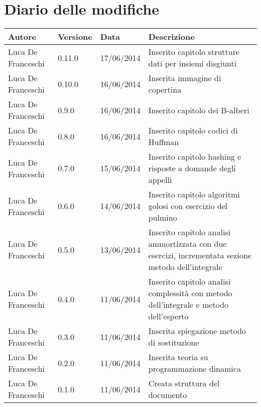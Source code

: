 \section*{Diario delle modifiche}

\begin{center}

	\begin{table}[htpd]
		\begin{tabular}{| l | l | l | p{50mm} |}
			\hline
			\hline
			\textbf{Autore} & \textbf{Versione} & \textbf{Data} & \textbf{Descrizione} \\
			\hline
			\hline 
			Luca De Franceschi & 0.11.0 & 17/06/2014 & Inserito capitolo strutture dati per insiemi disgiunti \\ \hline
			Luca De Franceschi & 0.10.0 & 16/06/2014 & Inserita immagine di copertina \\ \hline
			Luca De Franceschi & 0.9.0 & 16/06/2014 & Inserito capitolo dei B-alberi \\ \hline
			Luca De Franceschi & 0.8.0 & 16/06/2014 & Inserito capitolo codici di Huffman \\ \hline
			Luca De Franceschi & 0.7.0 & 15/06/2014 & Inserito capitolo hashing e risposte a domande degli appelli \\ \hline
			Luca De Franceschi & 0.6.0 & 14/06/2014 & Inserito capitolo algoritmi golosi con esercizio del pulmino \\ \hline
			Luca De Franceschi & 0.5.0 & 13/06/2014 & Inserito capitolo analisi ammortizzata con due esercizi, incrementata sezione metodo dell'integrale \\ \hline
			Luca De Franceschi & 0.4.0 & 11/06/2014 & Inserito capitolo analisi complessità con metodo dell'integrale e metodo dell'esperto \\ \hline
			Luca De Franceschi & 0.3.0 & 11/06/2014 & Inserita spiegazione metodo di sostituzione \\ \hline
			Luca De Franceschi & 0.2.0 & 11/06/2014 & Inserita teoria su programmazione dinamica \\ \hline
			Luca De Franceschi & 0.1.0 & 11/06/2014 & Creata struttura del documento \\ \hline
		\end{tabular}
	\end{table}
	
\end{center}
